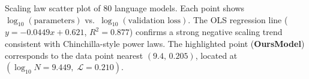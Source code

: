 \caption{Scaling law scatter plot of 80 language models. Each point shows $\log_{10}(\text{parameters})$ vs.\ $\log_{10}(\text{validation loss})$. The OLS regression line ($y = -0.0449x + 0.621$, $R^2 = 0.877$) confirms a strong negative scaling trend consistent with Chinchilla-style power laws. The highlighted point (\textbf{OursModel}) corresponds to the data point nearest $(9.4,\,0.205)$, located at $(\log_{10}N = 9.449,\;\mathcal{L} = 0.210)$.}
